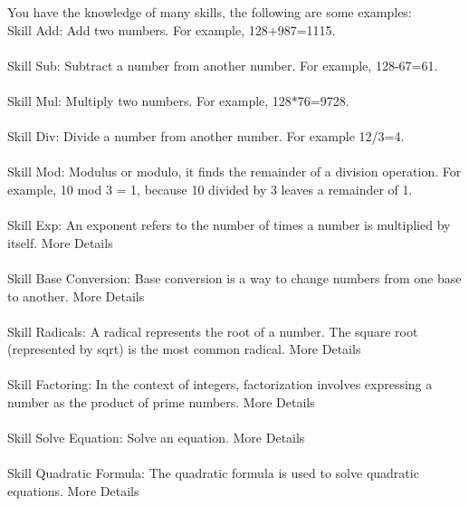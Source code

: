 \documentclass{article} \usepackage{arxiv}
\begin{document}
\begin{tcolorbox}[title = {Skills for MATH}, colback = Apricot!25!white, colframe = BrickRed!75!black,fontupper =\fontsize{7.5pt}{6pt}\selectfont] 
You have the knowledge of many skills, the following are some examples: \\
Skill Add: Add two numbers. For example, 128+987=1115.  \\ \\

Skill Sub: Subtract a number from another number. For example, 128-67=61.   \\ \\

Skill Mul: Multiply two numbers. For example, 128*76=9728.   \\ \\

Skill Div: Divide a number from another number. For example 12/3=4.  \\ \\

Skill Mod: Modulus or modulo, it finds the remainder of a division operation. For example, 10 mod 3 = 1, because 10 divided by 3 leaves a remainder of 1.  \\ \\

Skill Exp: An exponent refers to the number of times a number is multiplied by itself.  More Details \\ \\

Skill Base Conversion: Base conversion is a way to change numbers from one base to another.   More Details\\ \\

Skill Radicals: A radical represents the root of a number. The square root (represented by sqrt) is the most common radical. More Details\\ \\


Skill Factoring: In the context of integers, factorization involves expressing a number as the product of prime numbers. More Details\\ \\

Skill Solve Equation: Solve an equation.   More Details\\ \\

Skill Quadratic Formula: The quadratic formula is used to solve quadratic equations. More Details\\ \\



\end{tcolorbox}
\end{document}
